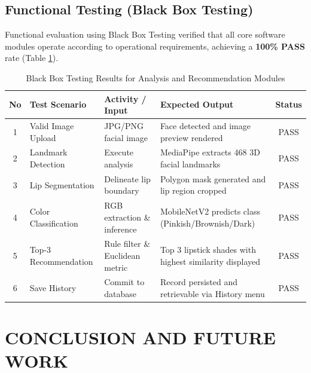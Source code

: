 \documentclass[10pt,a4paper]{article}
\begin{document}
\subsection{Functional Testing (Black Box Testing)}
Functional evaluation using Black Box Testing verified that all core software modules operate according to operational requirements, achieving a \textbf{100\% PASS} rate (Table \ref{tab:blackbox}).

\begin{table}[htbp]
  \centering
  \caption{Black Box Testing Results for Analysis and Recommendation Modules}
  \label{tab:blackbox}
  \fontsize{8pt}{10pt}\selectfont
  \begin{tabularx}{\textwidth}{clXXc}
    \toprule
    \textbf{No} & \textbf{Test Scenario} & \textbf{Activity / Input} & \textbf{Expected Output} & \textbf{Status} \\
    \midrule
    1 & Valid Image Upload     & JPG/PNG facial image & Face detected and image preview rendered & PASS \\
    2 & Landmark Detection     & Execute analysis & MediaPipe extracts 468 3D facial landmarks & PASS \\
    3 & Lip Segmentation       & Delineate lip boundary & Polygon mask generated and lip region cropped & PASS \\
    4 & Color Classification   & RGB extraction \& inference & MobileNetV2 predicts class (Pinkish/Brownish/Dark) & PASS \\
    5 & Top-3 Recommendation   & Rule filter \& Euclidean metric & Top 3 lipstick shades with highest similarity displayed & PASS \\
    6 & Save History           & Commit to database & Record persisted and retrievable via History menu & PASS \\
    \bottomrule
  \end{tabularx}
\end{table}

\FloatBarrier
\section{CONCLUSION AND FUTURE WORK}
\end{document}
